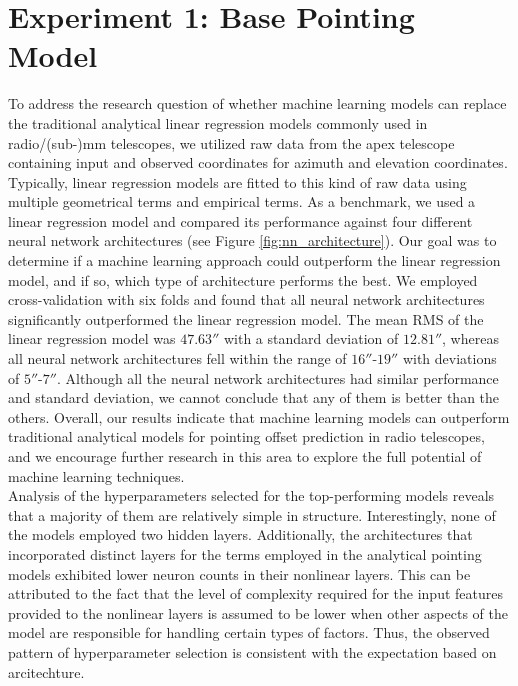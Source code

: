 \section{Experiment 1: Base Pointing Model}
To address the research question of whether machine learning models can replace the traditional analytical linear regression models commonly used in radio/(sub-)mm telescopes,
we utilized raw data from the apex telescope containing input and observed coordinates for azimuth and elevation coordinates.
Typically, linear regression models are fitted to this kind of raw data using multiple geometrical terms and empirical terms.
As a benchmark, we used a linear regression model and compared its performance against four different neural network architectures (see Figure \ref{fig:nn_architecture}).
Our goal was to determine if a machine learning approach could outperform the linear regression model, and if so, which type of architecture performs the best.
We employed cross-validation with six folds and found that all neural network architectures significantly outperformed the linear regression model.
The mean RMS of the linear regression model was $47.63''$ with a standard deviation of $12.81''$, whereas all neural network architectures fell within the range of $16''$-$19''$ with deviations of $5''$-$7''$.
Although all the neural network architectures had similar performance and standard deviation, we cannot conclude that any of them is better than the others.
Overall, our results indicate that machine learning models can outperform traditional analytical models for pointing offset prediction in radio telescopes,
and we encourage further research in this area to explore the full potential of machine learning techniques.\\

Analysis of the hyperparameters selected for the top-performing models reveals that a majority of them are relatively simple in structure.
Interestingly, none of the models employed two hidden layers.
Additionally, the architectures that incorporated distinct layers for the terms employed in the analytical pointing models exhibited lower neuron counts in their nonlinear layers.
This can be attributed to the fact that the level of complexity required for the input features provided to the nonlinear layers is assumed to be lower when other aspects of the model are responsible for handling certain types of factors.
Thus, the observed pattern of hyperparameter selection is consistent with the expectation based on arcitechture.\\

